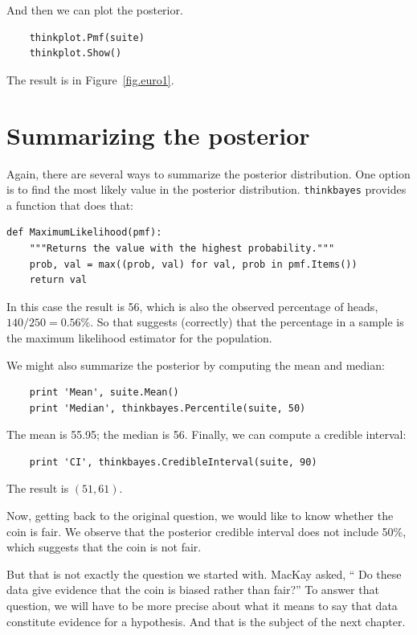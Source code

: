 \documentclass[12pt]{book}
\begin{document}
And then we can plot the posterior.

\begin{verbatim}
    thinkplot.Pmf(suite)
    thinkplot.Show()
\end{verbatim}

The result is in Figure~\ref{fig.euro1}.


\section{Summarizing the posterior}

Again, there are several ways to summarize the posterior distribution.
One option is to find the most likely value in the posterior
distribution.  \verb"thinkbayes" provides a function that does 
that:

\begin{verbatim}
def MaximumLikelihood(pmf):
    """Returns the value with the highest probability."""
    prob, val = max((prob, val) for val, prob in pmf.Items())
    return val
\end{verbatim}

In this case the result is 56, which is also the observed percentage of
heads, $140/250 = 0.56\%$.  So that suggests (correctly) that the
percentage in a sample is the maximum likelihood estimator
for the population.

We might also summarize the posterior by computing the mean
and median:

\begin{verbatim}
    print 'Mean', suite.Mean()
    print 'Median', thinkbayes.Percentile(suite, 50)
\end{verbatim}

The mean is 55.95; the median is 56.  Finally, we can compute a
credible interval: 

\begin{verbatim}
    print 'CI', thinkbayes.CredibleInterval(suite, 90)
\end{verbatim}

The result is $(51, 61)$.

Now, getting back to the original question, we would like to know
whether the coin is fair.  We observe that the posterior credible
interval does not include 50\%, which suggests that the coin is not
fair.

But that is not exactly the question we started with.  MacKay asked,
`` Do these data give evidence that the coin is biased rather than
fair?''  To answer that question, we will have to be more precise
about what it means to say that data constitute evidence for
a hypothesis.  And that is the subject of the next chapter.
\end{document}
